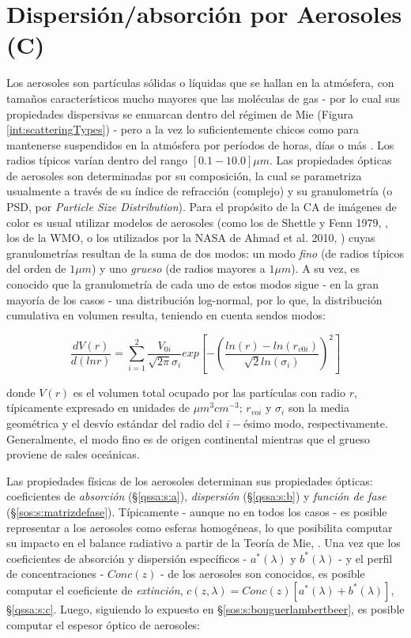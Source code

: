 \section{Dispersión/absorción por Aerosoles (C)}
\label{int:s:aerosoles}

    Los aerosoles son partículas sólidas o líquidas que se hallan en la atmósfera, con tamaños característicos mucho mayores que las moléculas de gas - por lo cual sus propiedades dispersivas se enmarcan dentro del régimen de Mie (Figura \ref{int:scatteringTypes}) - pero a la vez lo suficientemente chicos como para mantenerse suspendidos en la atmósfera por períodos de horas, días o más \cite{mobley2016}. Los radios típicos varían dentro del rango $[0.1 - 10.0] \mu m$. Las propiedades ópticas de aerosoles son determinadas por su composición, la cual se parametriza usualmente a través de su índice de refracción (complejo) y su granulometría (o PSD, por \textit{Particle Size Distribution}). Para el propósito de la CA de imágenes de color es usual utilizar modelos de aerosoles (como los de Shettle y Fenn 1979, \cite{shettle1979}, los de la WMO, \cite{wmo1986} o los utilizados por la NASA de Ahmad et al. 2010, \cite{ahmad2010}) cuyas granulometrías resultan de la suma de dos modos: un modo \textit{fino} (de radios típicos del orden de $1 \mu m$) y uno \textit{grueso} (de radios mayores a $1 \mu m$). A su vez, es conocido que la granulometría de cada uno de estos modos sigue - en la gran mayoría de los casos - una distribución log-normal, por lo que, la distribución cumulativa en volumen resulta, teniendo en cuenta sendos modos: \cite{ahmad2010}
    
    \begin{equation}
        \frac{dV(r)}{d(lnr)} = \sum_{i=1}^{2}\frac{V_{0i}}{\sqrt{2\pi}\sigma_{i}}exp\left[-\left(\frac{ln(r)-ln(r_{v0i})}{\sqrt{2}ln(\sigma_{i})}\right)^{2}\right]
        \label{int:eq:aer_psd}
    \end{equation}
    
    \noindent donde $V(r)$ es el volumen total ocupado por las partículas con radio $r$, típicamente expresado en unidades de $\mu m^{3}cm^{-3}$; $r_{voi}$ y $\sigma_{i}$ son la media geométrica y el desvío estándar del radio del $i-$ésimo modo, respectivamente. Generalmente, el modo fino es de origen continental mientras que el grueso proviene de sales oceánicas.
    
    Las propiedades físicas de los aerosoles determinan sus propiedades ópticas: coeficientes de \textit{absorción} (\S \ref{qssa:s:a}),  \textit{dispersión} (\S \ref{qssa:s:b}) y \textit{función de fase} (\S \ref{sos:s:matrizdefase}). Típicamente - aunque no en todos los casos - es posible representar a los aerosoles como esferas homogéneas, lo que posibilita computar su impacto en el balance radiativo a partir de la Teoría de Mie, \cite{mishchenko2002}. Una vez que los coeficientes de absorción y dispersión específicos - $a^{*}(\lambda)$ y $b^{*}(\lambda)$ - y el perfil de concentraciones - $Conc(z)$ - de los aerosoles son conocidos, es posible computar el coeficiente de \textit{extinción}, $c(z,\lambda) = Conc(z)[a^{*}(\lambda) + b^{*}(\lambda)]$, \S \ref{qssa:s:c}. Luego, siguiendo lo expuesto en \S \ref{sos:s:bouguerlambertbeer}, es posible computar el espesor óptico de aerosoles:
    
